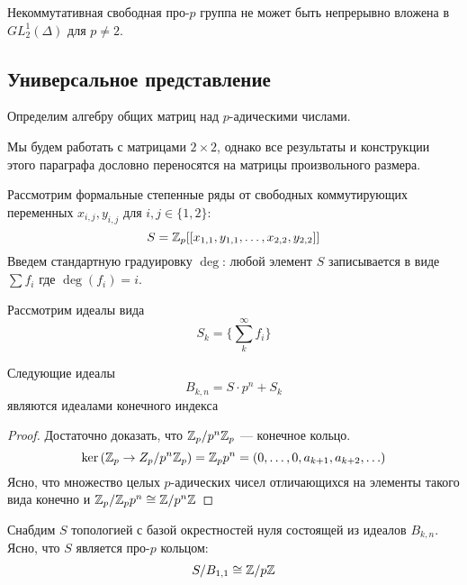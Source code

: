\begin{theorem}[Зубков, 1989]
    \label{thm:Zubkov-main}
    Некоммутативная свободная про-$p$ группа не может быть непрерывно вложена в $GL^1_2(\Delta)$ для $p\neq 2$.
\end{theorem}

\subsection{Универсальное представление}\label{subsec:zubkov-universal}
Определим алгебру общих матриц над $p$-адическими числами.

Мы будем работать с матрицами $2\times2$, однако все результаты и конструкции этого параграфа дословно переносятся на матрицы произвольного размера.

Рассмотрим формальные степенные ряды от свободных коммутирующих переменных $x_{i,j}, y_{i,j}$ для $i,j \in \{ 1, 2 \}$:
\[
    S = \mathbb{Z}_{p} [[ x_{1,1}, y_{1,1}, \ldots, x_{2,2}, y_{2,2} ]]
\]
Введем стандартную градуировку $\deg$: любой элемент $S$ записывается в виде $\sum f_i$ где $\deg{(f_i)} = i$.

Рассмотрим идеалы вида
\[
    S_k = \{\sum\limits_k^{\infty} f_i \}
\]

\vskip 0.1in\noindent
\begin{proposition}
    Следующие идеалы
    \[B_{k,n} = S \cdot p^n + S_k \]
    являются идеалами конечного индекса
\end{proposition}
\begin{proof}
    Достаточно доказать, что $\mathbb{Z}_p / p^n\mathbb{Z}_p$ --- конечное кольцо.
    \[
        \ker{(\ensuremath{\mathbb{Z}}_p \to Z_p / p^n\ensuremath{\mathbb{Z}}_p )} = \mathbb{Z}_p p^n = \left( 0,\ldots, 0, a_{k+1}, a_{k+2}, \ldots \right)
    \]
    Ясно, что множество целых $p$-адических чисел отличающихся на элементы такого вида конечно и
    $\mathbb{Z}_p / \mathbb{Z}_p p^n \cong \mathbb{Z} / p^n\mathbb{Z}$
\end{proof}

Снабдим $S$ топологией с базой окрестностей нуля состоящей из идеалов $B_{k,n}$.
Ясно, что $S$ является про-$p$ кольцом:
\[
    S / B_{1,1} \cong \mathbb{Z}/p\mathbb{Z}
\]

